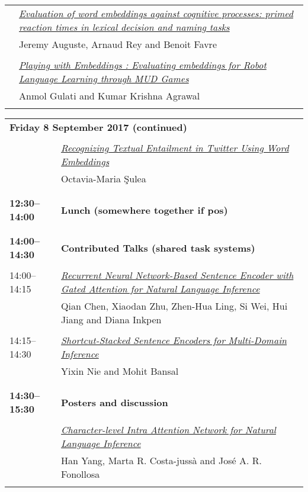 \begin{tabular}{p{20mm}p{128mm}}
 & \hyperlink{page.11}{\em Evaluation of word embeddings against cognitive processes: primed reaction times in lexical decision and naming tasks}\\
         & Jeremy Auguste, Arnaud Rey and Benoit Favre \\
\\

 & \hyperlink{page.17}{\em Playing with Embeddings : Evaluating embeddings for Robot Language Learning through MUD Games}\\
         & Anmol Gulati and Kumar Krishna Agrawal \\
\\

\end{tabular}
\newpage
\begin{tabular}{p{20mm}p{128mm}}
\\
\multicolumn{2}{l}{\bf Friday 8 September 2017 (continued)} \\\\
 & \hyperlink{page.21}{\em Recognizing Textual Entailment in Twitter Using Word Embeddings}\\
         & Octavia-Maria \c{S}ulea \\
\\

\\{\bf 12:30--14:00} & {\bf Lunch (somewhere together if pos)} \\
\\
\\{\bf 14:00--14:30} & {\bf Contributed Talks (shared task systems)} \\
\\
14:00--14:15 & \hyperlink{page.26}{\em Recurrent Neural Network-Based Sentence Encoder with Gated Attention for Natural Language Inference}\\
         & Qian Chen, Xiaodan Zhu, Zhen-Hua Ling, Si Wei, Hui Jiang and Diana Inkpen \\
\\

14:15--14:30 & \hyperlink{page.31}{\em Shortcut-Stacked Sentence Encoders for Multi-Domain Inference}\\
         & Yixin Nie and Mohit Bansal \\
\\

\\{\bf 14:30--15:30} & {\bf Posters and discussion} \\
\\
 & \hyperlink{page.36}{\em Character-level Intra Attention Network for Natural Language Inference}\\
         & Han Yang, Marta R. Costa-juss\`{a} and Jos\'{e} A. R. Fonollosa \\
\\


\end{tabular}
